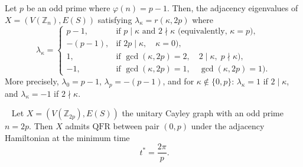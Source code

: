 \documentclass[10pt,a4paper]{amsart}
\newcommand{\QFR}{\mathrm{QFR}}
\begin{document}
\begin{lemma}\label{lem01eigs2p}
Let $p$ be an odd prime where $\varphi(n)=p-1$. Then, the adjacency eigenvalues
  of $X = (V(\mathbb{Z}_n),E(S))$ satisfying $ \lambda_\kappa=r(\kappa, 2p)$ where 
  \[
    \lambda_\kappa=
    \begin{cases}
      p-1,  & \text{if } p \mid \kappa \text{ and } 2 \nmid \kappa \text{ (equivalently, } \kappa = p), \\
      -(p-1), & \text{if } 2p \mid \kappa, \quad  \kappa= 0), \\
      1,   & \text{if } \gcd(\kappa, 2p) = 2, \quad 2 \mid \kappa,\; p \nmid \kappa), \\
      -1,  & \text{if } \gcd(\kappa, 2p) = 1, \quad \gcd(\kappa, 2p) = 1).
    \end{cases}
  \]
  More precisely, $\lambda_0 = p-1$, $\lambda_p = -(p-1)$, and for $\kappa \notin \{0, p\}$:
  $\lambda_\kappa = 1$ if $2 \mid \kappa$, and $\lambda_\kappa = -1$ if $2 \nmid \kappa$.
\end{lemma}

\begin{theorem}~\label{Thm2revivaltime}
Let $X = (V(\mathbb{Z}_{2p}), E(S))$ the unitary Cayley graph with an odd prime $n=2p$. Then $X$ admits $\QFR$ between pair $(0, p)$ under the adjacency Hamiltonian at the
  minimum time
\begin{equation}~\label{eqq1Thm2revivaltime}
 t^* = \frac{2\pi}{p}.
\end{equation}
\end{theorem}
\end{document}
